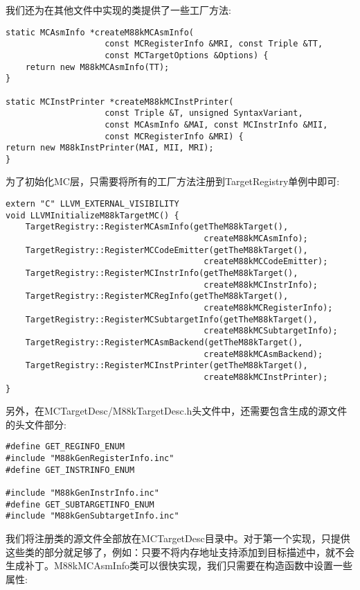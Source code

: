 我们还为在其他文件中实现的类提供了一些工厂方法:\par

\begin{lstlisting}[caption={}]
static MCAsmInfo *createM88kMCAsmInfo(
					const MCRegisterInfo &MRI, const Triple &TT,
					const MCTargetOptions &Options) {
	return new M88kMCAsmInfo(TT);
}

static MCInstPrinter *createM88kMCInstPrinter(
					const Triple &T, unsigned SyntaxVariant,
					const MCAsmInfo &MAI, const MCInstrInfo &MII,
					const MCRegisterInfo &MRI) {
return new M88kInstPrinter(MAI, MII, MRI);
}
\end{lstlisting}

为了初始化MC层，只需要将所有的工厂方法注册到TargetRegistry单例中即可:\par

\begin{lstlisting}[caption={}]
extern "C" LLVM_EXTERNAL_VISIBILITY
void LLVMInitializeM88kTargetMC() {
	TargetRegistry::RegisterMCAsmInfo(getTheM88kTarget(),
										createM88kMCAsmInfo);
	TargetRegistry::RegisterMCCodeEmitter(getTheM88kTarget(),
										createM88kMCCodeEmitter);
	TargetRegistry::RegisterMCInstrInfo(getTheM88kTarget(),
										createM88kMCInstrInfo);
	TargetRegistry::RegisterMCRegInfo(getTheM88kTarget(),
										createM88kMCRegisterInfo);
	TargetRegistry::RegisterMCSubtargetInfo(getTheM88kTarget(),
										createM88kMCSubtargetInfo);
	TargetRegistry::RegisterMCAsmBackend(getTheM88kTarget(),
										createM88kMCAsmBackend);
	TargetRegistry::RegisterMCInstPrinter(getTheM88kTarget(),
										createM88kMCInstPrinter);
}
\end{lstlisting}

另外，在MCTargetDesc/M88kTargetDesc.h头文件中，还需要包含生成的源文件的头文件部分:\par

\begin{lstlisting}[caption={}]
#define GET_REGINFO_ENUM
#include "M88kGenRegisterInfo.inc"
#define GET_INSTRINFO_ENUM

#include "M88kGenInstrInfo.inc"
#define GET_SUBTARGETINFO_ENUM
#include "M88kGenSubtargetInfo.inc"
\end{lstlisting}

我们将注册类的源文件全部放在MCTargetDesc目录中。对于第一个实现，只提供这些类的部分就足够了，例如：只要不将内存地址支持添加到目标描述中，就不会生成补丁。M88kMCAsmInfo类可以很快实现，我们只需要在构造函数中设置一些属性:\par

